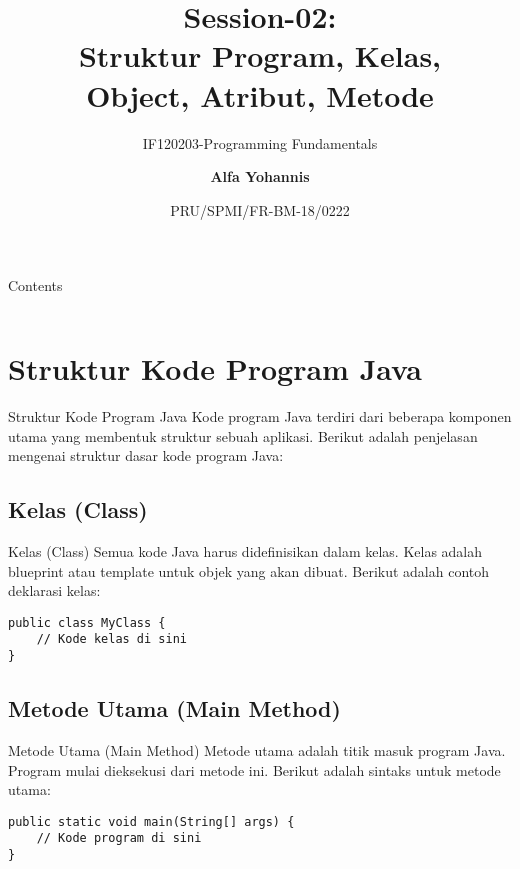 \documentclass[aspectratio=169, table]{beamer}
\subtitle{IF120203-Programming Fundamentals}
\title{Session-02:\\\LARGE{Struktur Program, Kelas,\\Object, Atribut, Metode}}
\date[Serial]{\scriptsize {PRU/SPMI/FR-BM-18/0222}}
\author[Pradita]{\small{\textbf{Alfa Yohannis}}}
\begin{document}
\frame{\titlepage}

\begin{frame}[fragile]{Contents}
\vspace{15pt}
\begin{columns}[t]
\begin{column}{.5\textwidth}
	\tableofcontents[sections={1-3}]
\end{column}
\begin{column}{.5\textwidth}
	\tableofcontents[sections={4-6}]
\end{column}
\end{columns}
\end{frame}


\section{Struktur Kode Program Java}

\begin{frame}[fragile]{Struktur Kode Program Java}
Kode program Java terdiri dari beberapa komponen utama yang membentuk struktur sebuah aplikasi. Berikut adalah penjelasan mengenai struktur dasar kode program Java:
\end{frame}

\subsection{Kelas (Class)}
\begin{frame}[fragile]{Kelas (Class)}
Semua kode Java harus didefinisikan dalam kelas. Kelas adalah blueprint atau template untuk objek yang akan dibuat. Berikut adalah contoh deklarasi kelas:

\begin{lstlisting}[style=JavaStyle]
public class MyClass {
	// Kode kelas di sini
}
\end{lstlisting}
\end{frame}

\subsection{Metode Utama (Main Method)}
\begin{frame}[fragile]{Metode Utama (Main Method)}
Metode utama adalah titik masuk program Java. Program mulai dieksekusi dari metode ini. Berikut adalah sintaks untuk metode utama:

\begin{lstlisting}[style=JavaStyle]
public static void main(String[] args) {
	// Kode program di sini
}
\end{lstlisting}
\end{frame}
\end{document}
